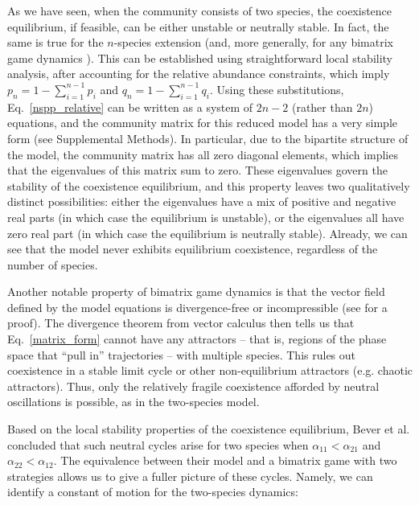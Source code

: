 \documentclass[11pt]{article}
\begin{document}
As we have seen, when the community consists of two species, the coexistence equilibrium, if feasible, can be either unstable or neutrally stable. In fact, the same is true for the $n$-species extension (and, more generally, for any bimatrix game dynamics \cite{eshel1983coevolutionary,selten1988note,hofbauer1998evolutionary}). This can be established using straightforward local stability analysis, after accounting for the relative abundance constraints, which imply $p_n = 1 - \sum_{i = 1}^{n-1} p_i$ and $q_n = 1 - \sum_{i = 1}^{n-1} q_i$. Using these substitutions, Eq.~\ref{nspp_relative} can be written as a system of $2 n - 2$ (rather than $2 n$) equations, and the community matrix for this reduced model has a very simple form (see Supplemental Methods). In particular, due to the bipartite structure of the model, the community matrix has all zero diagonal elements, which implies that the eigenvalues of this matrix sum to zero. These eigenvalues govern the stability of the coexistence equilibrium, and this property leaves two qualitatively distinct possibilities: either the eigenvalues have a mix of positive and negative real parts (in which case the equilibrium is unstable), or the eigenvalues all have zero real part (in which case the equilibrium is neutrally stable). Already, we can see that the model never exhibits equilibrium coexistence, regardless of the number of species.

Another notable property of bimatrix game dynamics is that the vector field defined by the model equations is divergence-free or incompressible (see \cite{hofbauer1998evolutionary} for a proof). The divergence theorem from vector calculus \cite{arfken1985mathematical} then tells us that Eq.~\ref{matrix_form} cannot have any attractors -- that is, regions of the phase space that ``pull in'' trajectories -- with multiple species. This rules out coexistence in a stable limit cycle or other non-equilibrium attractors (e.g. chaotic attractors). Thus, only the relatively fragile coexistence afforded by neutral oscillations is possible, as in the two-species model.

Based on the local stability properties of the coexistence equilibrium, Bever et al. concluded that such neutral cycles arise for two species when $\alpha_{11} < \alpha_{21}$ and $\alpha_{22} < \alpha_{12}$. The equivalence between their model and a bimatrix game with two strategies allows us to give a fuller picture of these cycles. Namely, we can identify a constant of motion for the two-species dynamics:
\end{document}
